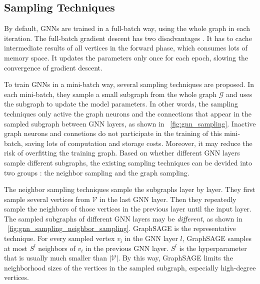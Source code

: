 \subsection{Sampling Techniques}

By default, GNNs are trained in a full-batch way, using the whole graph in each iteration.
The full-batch gradient descent has two disadvantages \cite{chiang2019_cluster_gcn}.
It has to cache intermediate results of all vertices in the forward phase, which consumes lots of memory space.
It updates the parameters only once for each epoch, slowing the convergence of gradient descent.

To train GNNs in a mini-batch way, several sampling techniques \cite{chiang2019_cluster_gcn} are proposed.
In each mini-batch, they sample a small subgraph from the whole graph $\mathcal{G}$ and uses the subgraph to update the model parameters.
In other words, the sampling techniques only active the graph neurons and the connections that appear in the sampled subgraph between GNN layers, as shown in \figurename~\ref{fig:gnn_sampling}.
Inactive graph neurons and connetions do not participate in the training of this mini-batch, saving lots of computation and storage costs.
Moreover, it may reduce the risk of overfitting the training graph.
Based on whether different GNN layers sample different subgraphs, the existing sampling techniques can be devided into two groups \cite{zeng2020_graphsaint}: the neighbor sampling and the graph sampling.

The neighbor sampling techniques \cite{hamilton2017_graphsage, ying2018_pinsage, chen2018_fastgcn, chen2018_sgcn, huang2018_adap} sample the subgraphs layer by layer.
They first sample several vertices from $\mathcal{V}$ in the last GNN layer.
Then they repeatedly sample the neighbors of those vertices in the previous layer until the input layer.
The sampled subgraphs of different GNN layers may be \emph{different}, as shown in \figurename~\ref{fig:gnn_sampling_neighbor_sampling}.
GraphSAGE \cite{hamilton2017_graphsage} is the representative technique.
For every sampled vertex $v_i$ in the GNN layer $l$, GraphSAGE samples at most $S^l$ neighbors of $v_i$ in the previous GNN layer.
$S^l$ is the hyperparameter that is usually much smaller than $|\mathcal{V}|$.
By this way, GraphSAGE limits the neighborhood sizes of the vertices in the sampled subgraph, especially high-degree vertices.

